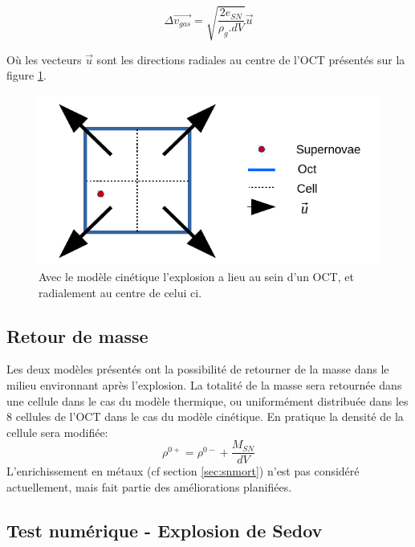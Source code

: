 \begin{equation}
    \Delta \overrightarrow{v_{gas}} = \sqrt{\frac{2e_{SN}}{\rho_g.dV}} \overrightarrow{u}
    \label{eq_sn_direct}
\end{equation}

Où les vecteurs $\overrightarrow{u}$ sont les directions radiales au centre de l'OCT présentés sur la figure \ref{fig:kin}.

\begin{figure}
        \includegraphics[width=.95\linewidth]{img/03/oct_kinetic.pdf} 
        \caption[Injection d'énergie cinétique]{Avec le modèle cinétique l'explosion a lieu au sein d'un OCT, et radialement au centre de celui ci.
 		\label{fig:kin}}
\end{figure}

\subsection{Retour de masse}
Les deux modèles présentés ont la possibilité de retourner de la masse dans le milieu environnant après l'explosion.
La totalité de la masse sera retournée dans une cellule dans le cas du modèle thermique, ou uniformément distribuée dans les 8 cellules de l'OCT dans le cas du modèle cinétique.
En pratique la densité de la cellule sera modifiée:
\begin{equation}
\rho^{0+} = \rho^{0-} + \frac{M_{SN}}{dV}
\end{equation}
L’enrichissement en métaux (cf section \ref{sec:snmort}) n'est pas considéré actuellement, mais fait partie des améliorations planifiées.

\subsection{Test numérique - Explosion de Sedov}
\label{sec:sedov}


